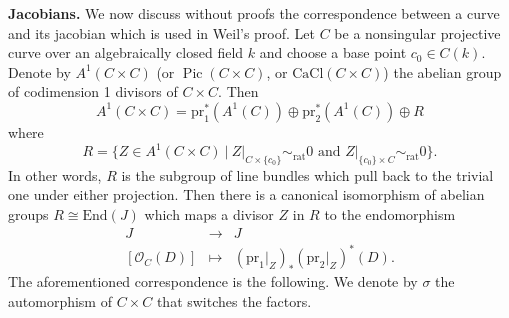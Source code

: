 \documentclass{stacks-project}
\theoremstyle{plain}
\theoremstyle{definition}
\theoremstyle{remark}
\numberwithin{equation}{subsection}
\def\Pic{\mathop{\mathrm{Pic}}\nolimits}
\begin{document}
\noindent
{\bf Jacobians.}
We now discuss without proofs the correspondence between a curve and its
jacobian which is used in Weil's proof. Let $C$ be a nonsingular projective
curve over an algebraically closed field $k$ and choose a base point $c_0 \in
C(k)$. Denote by $A^1(C \times C)$ (or $\Pic(C \times C)$, or
$\text{CaCl}(C \times C)$) the abelian group of codimension 1 divisors of
$C \times C$. Then
$$
A^1(C \times C) = \text{pr}_1^* (A^1(C)) \oplus \text{pr}_2^* (A^1(C)) \oplus R
$$
where
$$
R = \{ Z \in A^1(C \times C) \ |
\ Z|_{C \times \{c_0\}} \sim_\text{rat} 0
\text{ and }
Z|_{\{c_0\} \times C} \sim_\text{rat} 0 \}.
$$
In other words,
$R$ is the subgroup of line bundles which pull back to the trivial one under
either projection. Then there is a canonical isomorphism of abelian groups $R
\cong \text{End}(J)$ which maps a divisor $Z$ in $R$ to the endomorphism
$$
\begin{matrix}
J & \to & J \\
\left[ \mathcal{O}_C(D) \right] & \mapsto & (\text{pr}_1 |_Z)_* (\text{pr}_2
|_Z)^* (D).
\end{matrix}
$$
The aforementioned correspondence is the following. We denote by $\sigma$ the
automorphism of $C \times C$ that switches the factors.
\end{document}
